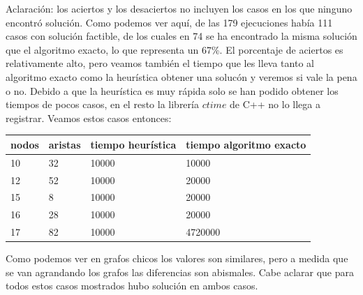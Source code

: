 Aclaraci\'on: los aciertos y los desaciertos no incluyen los casos en los que ninguno encontr\'o soluci\'on.
Como podemos ver aqu\'i, de las 179 ejecuciones hab\'ia 111 casos con soluci\'on factible, de los cuales en 74 se ha encontrado la misma soluci\'on que el algoritmo exacto, lo que representa un 67\%. 
El porcentaje de aciertos es relativamente alto, pero veamos tambi\'en el tiempo que les lleva tanto al algoritmo exacto como la heur\'istica obtener una soluc\'on y veremos si vale la pena o no.
Debido a que la heur\'istica es muy r\'apida solo se han podido obtener los tiempos de pocos casos, en el resto la librer\'ia $ctime$ de C++ no lo llega a registrar. Veamos estos casos entonces:

\begin{tabular}{ | l | l | l | l | }
\hline
nodos & aristas & tiempo heur\'istica & tiempo algoritmo exacto \\
\hline
10 & 32 & 10000	& 10000 \\
12 & 52 & 10000 & 20000 \\
15 & 8 & 10000 & 20000 \\
16 & 28 & 10000 & 20000 \\
17 & 82 & 10000 & 4720000 \\
\hline
\end{tabular}

Como podemos ver en grafos chicos los valores son similares, pero a medida que se van agrandando los grafos las diferencias son abismales.
Cabe aclarar que para todos estos casos mostrados hubo soluci\'on en ambos casos.
